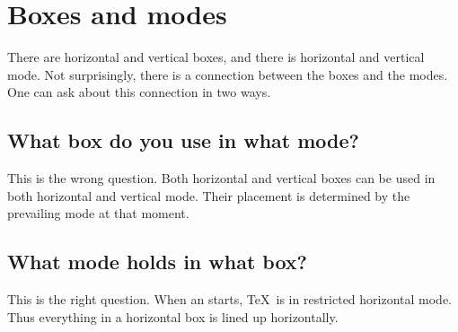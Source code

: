 \documentclass[twoside,letterpaper,openright]{rapport3}
\begin{document}
\section{Boxes and modes}
\label{hvbox}

There are horizontal and vertical boxes, and there is
horizontal and vertical mode. Not surprisingly, there is
a connection between the boxes and the modes.
One can ask about this connection in two ways.

\subsection{What box do you use in what mode?}

This is the wrong question. Both horizontal  and vertical boxes
can be used in both horizontal and vertical mode. 
Their placement is determined by the prevailing mode at that moment.

\subsection{What mode holds in what box?}

This is the right question.
When an  starts, \TeX\ is in restricted horizontal
mode. Thus everything in a horizontal box is lined up horizontally.
\end{document}
